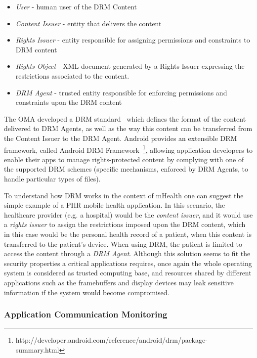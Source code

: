 \begin{itemize}
	\item \emph{User} - human user of the DRM Content
	\item \emph{Content Issuer} - entity that delivers the content
	\item \emph{Rights Issuer} - entity responsible for assigning permissions and constraints to \ac{DRM} content
	\item \emph{Rights Object} - XML document generated by a Rights Issuer expressing the restrictions associated to the content.
	\item \emph{\ac{DRM} Agent} - trusted entity responsible for enforcing permissions and constraints upon the \ac{DRM} content
\end{itemize}

The \ac{OMA} developed a DRM standard~\cite{drm} which defines the format of the content delivered to DRM Agents, as well as the way this content can be transferred from the Content Issuer to the DRM Agent. Android provides an extensible DRM framework, called Android DRM Framework~\footnote{http://developer.android.com/reference/android/drm/package-summary.html}, allowing application developers to enable their apps to manage rights-protected content by complying with one of the supported DRM schemes (specific mechanisms, enforced by DRM Agents, to handle particular types of files).

To understand how \ac{DRM} works in the context of mHealth one can suggest the simple example of a \ac{PHR} mobile health application. In this scenario, the healthcare provider (e.g. a hospital) would be the \emph{content issuer}, and it would use a \emph{rights issuer} to assign the restrictions imposed upon the \ac{DRM} content, which in this case would be the personal health record of a patient, when this content is transferred to the patient's device. When using \ac{DRM}, the patient is limited to access the content through a \emph{\ac{DRM} Agent}. Although this solution seems to fit the security properties a critical applications requires, once again the whole operating system is considered as trusted computing base, and resources shared by different applications such as the framebuffers and display devices may leak sensitive information if the system would become compromised.

\subsubsection{Application Communication Monitoring}

